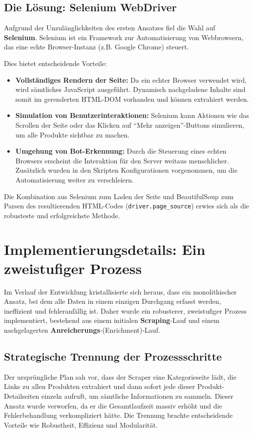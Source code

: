 \documentclass[12pt, a4paper]{report} %
\begin{document}
\subsection{Die Lösung: Selenium WebDriver}
Aufgrund der Unzulänglichkeiten des ersten Ansatzes fiel die Wahl auf \textbf{Selenium}. Selenium ist ein Framework zur Automatisierung von Webbrowsern, das eine echte Browser-Instanz (z.B. Google Chrome) steuert.

Dies bietet entscheidende Vorteile:
\begin{itemize}
    \item \textbf{Vollständiges Rendern der Seite:} Da ein echter Browser verwendet wird, wird sämtliches JavaScript ausgeführt. Dynamisch nachgeladene Inhalte sind somit im gerenderten HTML-DOM vorhanden und können extrahiert werden.
    \item \textbf{Simulation von Benutzerinteraktionen:} Selenium kann Aktionen wie das Scrollen der Seite oder das Klicken auf "`Mehr anzeigen"'-Buttons simulieren, um alle Produkte sichtbar zu machen.
    \item \textbf{Umgehung von Bot-Erkennung:} Durch die Steuerung eines echten Browsers erscheint die Interaktion für den Server weitaus menschlicher. Zusätzlich wurden in den Skripten Konfigurationen vorgenommen, um die Automatisierung weiter zu verschleiern.
\end{itemize}
Die Kombination aus Selenium zum Laden der Seite und BeautifulSoup zum Parsen des resultierenden HTML-Codes (\texttt{driver.page\_source}) erwies sich als die robusteste und erfolgreichste Methode.

\section{Implementierungsdetails: Ein zweistufiger Prozess}
\label{sec:scraping_prozess}
Im Verlauf der Entwicklung kristallisierte sich heraus, dass ein monolithischer Ansatz, bei dem alle Daten in einem einzigen Durchgang erfasst werden, ineffizient und fehleranfällig ist. Daher wurde ein robusterer, zweistufiger Prozess implementiert, bestehend aus einem initialen \textbf{Scraping}-Lauf und einem nachgelagerten \textbf{Anreicherungs}-(Enrichment)-Lauf.

\subsection{Strategische Trennung der Prozessschritte}
Der ursprüngliche Plan sah vor, dass der Scraper eine Kategorieseite lädt, die Links zu allen Produkten extrahiert und dann sofort jede dieser Produkt-Detailseiten einzeln aufruft, um sämtliche Informationen zu sammeln. Dieser Ansatz wurde verworfen, da er die Gesamtlaufzeit massiv erhöht und die Fehlerbehandlung verkompliziert hätte. Die Trennung brachte entscheidende Vorteile wie Robustheit, Effizienz und Modularität.
\end{document}
